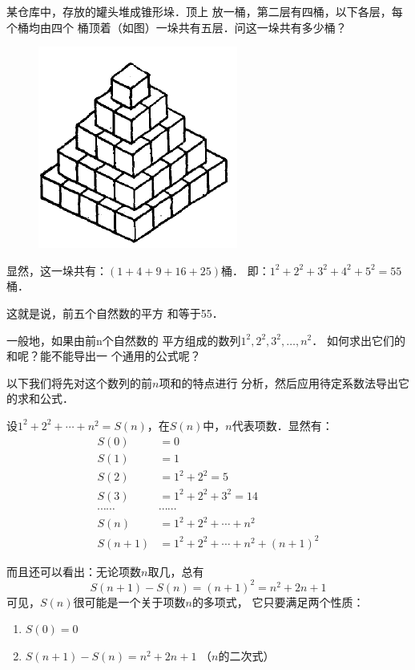\begin{example}
    某仓库中，存放的罐头堆成锥形垛．顶上
放一桶，第二层有四桶，以下各层，每个桶均由四个
桶顶着（如图）一垛共有五层．问这一垛共有多少桶？
\end{example}

\begin{figure}[htp]
    \centering
    \includegraphics[scale=.7]{1.png}
\end{figure}

\begin{solution}
    显然，这一垛共有：$(1+4+9+16+25)$桶．
即：$1^2+2^2+3^2+4^2+5^2=55$桶．

这就是说，前五个自然数的平方
和等于55．

一般地，如果由前n个自然数的
平方组成的数列$1^2,2^2,3^2,\ldots,n^2$．
如何求出它们的和呢？能不能导出一
个通用的公式呢？

以下我们将先对这个数列的前$n$项和的特点进行
分析，然后应用待定系数法导出它的求和公式．

设$1^2+2^2+\cdots+n^2=S(n)$，在$S(n)$中，$n$代表项数．显然有：
\[\begin{split}
   S(0)&=0\\ S(1)&=1\\ S(2)&=1^2+2^2=5\\ S(3)&=1^2+2^2+3^2=14\\
   \cdots \cdots&\cdots\cdots\\ 
   S(n)&=1^2+2^2+\cdots+n^2\\ 
   S(n+1)&=1^2+2^2+\cdots+n^2+(n+1)^2 
\end{split}\]

而且还可以看出：无论项数$n$取几，总有
\[S(n+1)-S(n)=(n+1)^2=n^2+2n+1\]
可见，$S(n)$很可能是一个关于项数$n$的多项式，
它只要满足两个性质：
\begin{enumerate}
    \item $S(0)=0$
    \item $S(n+1)-S(n)=n^2+2n+1$ （$n$的二次式）
\end{enumerate}
\end{solution}

